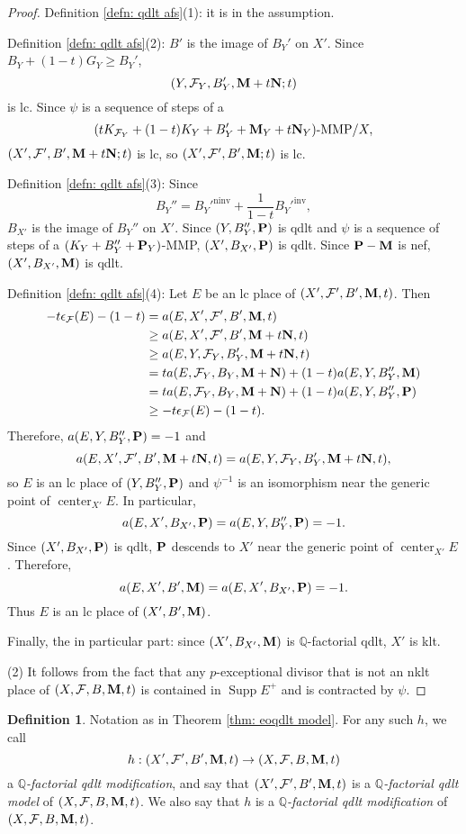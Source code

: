 \documentclass[12pt]{amsart}
\numberwithin{equation}{section}
\newcommand{\Mm}{{\bf{M}}}
\newcommand{\Nn}{{\bf{N}}}
\newcommand{\Pp}{{\bf{P}}}
\newcommand{\Qq}{\mathbb{Q}}
\newcommand{\Center}{\operatorname{center}}
\newcommand{\ninv}{\operatorname{ninv}}
\newcommand{\inv}{\operatorname{inv}}
\newcommand{\Supp}{\operatorname{Supp}}
\newcommand{\Ff}{\mathcal{F}}
\theoremstyle{definition}
\newtheorem{defn}[thm]{Definition}
\theoremstyle{definition}
\theoremstyle{definition}
\begin{document}
\begin{proof}
Definition \ref{defn: qdlt afs}(1): it is in the assumption.

Definition \ref{defn: qdlt afs}(2): $B'$ is the image of $B_Y'$ on $X'$. Since $B_Y+(1-t)G_Y\geq B_Y'$,
$$(Y,\Ff_Y,B_Y',\Mm+t\Nn;t)$$ is lc. Since $\psi$ is a sequence of steps of a 
$$(tK_{\Ff_Y}+(1-t)K_Y+B_Y'+\Mm_Y+t\Nn_Y)\text{-MMP}/X,$$
$(X',\Ff',B',\Mm+t\Nn;t)$
is lc, so $(X',\Ff',B',\Mm;t)$ is lc.

Definition \ref{defn: qdlt afs}(3): Since 
$$B_Y''=B_Y'^{\ninv}+\frac{1}{1-t}B_Y'^{\inv},$$
$B_{X'}$ is the image of $B_Y''$ on $X'$. Since $(Y,B''_{Y},\Pp)$ is qdlt and $\psi$ is a sequence of steps of a $(K_{Y}+B''_{Y}+\Pp_Y)$-MMP, $(X',B_{X'},\Pp)$ is qdlt. Since $\Pp-\Mm$ is nef, $(X',B_{X'},\Mm)$ is qdlt. 

Definition \ref{defn: qdlt afs}(4): Let $E$ be an lc place of $(X',\Ff',B',\Mm,t)$. Then
\begin{align*}
-t\epsilon_{\Ff}(E)-(1-t)&=a(E,X',\Ff',B',\Mm,t)\\
&\geq a(E,X',\Ff',B',\Mm+t\Nn,t)\\
&\geq a(E,Y,\Ff_Y,B_Y',\Mm+t\Nn,t)\\
&=ta(E,\Ff_Y,B_Y,\Mm+\Nn)+(1-t)a(E,Y,B_Y'',\Mm)\\
&=ta(E,\Ff_Y,B_Y,\Mm+\Nn)+(1-t)a(E,Y,B_Y'',\Pp)\\
&\geq -t\epsilon_{\Ff}(E)-(1-t).
\end{align*}
Therefore, $a(E,Y,B_Y'',\Pp)=-1$ and 
$$a(E,X',\Ff',B',\Mm+t\Nn,t)=a(E,Y,\Ff_Y,B_Y',\Mm+t\Nn,t),$$
so $E$ is an lc place of $(Y,B_Y'',\Pp)$ and $\psi^{-1}$ is an isomorphism near the generic point of $\Center_{X'}E$. In particular,
$$a(E,X',B_{X'},\Pp)=a(E,Y,B_{Y}'',\Pp)=-1.$$
Since $(X',B_{X'},\Pp)$ is qdlt, $\Pp$ descends to $X'$ near the generic point of $\Center_{X'}E$. Therefore, 
$$a(E,X',B',\Mm)=a(E,X',B_{X'},\Pp)=-1.$$
Thus $E$ is an lc place of $(X',B',\Mm)$.

Finally, the in particular part: since $(X',B_{X'},\Mm)$ is $\Qq$-factorial qdlt, $X'$ is klt.


(2) It follows from the fact that any $p$-exceptional divisor that is not an nklt place of $(X,\Ff,B,\Mm,t)$ is contained in $\Supp E^+$ and is contracted by $\psi$. 
\end{proof}

\begin{defn}
    Notation as in Theorem \ref{thm: eoqdlt model}. For any such $h$, we call
    $$h: (X',\Ff',B',\Mm,t)\rightarrow (X,\Ff,B,\Mm,t)$$
    a \emph{$\Qq$-factorial qdlt modification}, and say that $(X',\Ff',B',\Mm,t)$ is a \emph{$\Qq$-factorial qdlt model} of $(X,\Ff,B,\Mm,t)$. We also say that $h$ is a \emph{$\Qq$-factorial qdlt modification} of $(X,\Ff,B,\Mm,t)$.
\end{defn}
\end{document}
